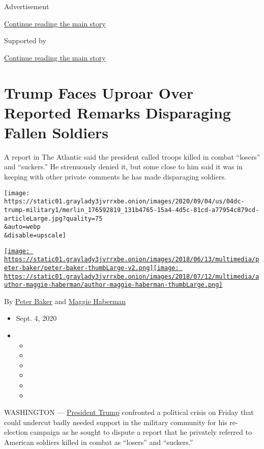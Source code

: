 Advertisement

\protect\hyperlink{after-top}{Continue reading the main story}

Supported by

\protect\hyperlink{after-sponsor}{Continue reading the main story}

\hypertarget{trump-faces-uproar-over-reported-remarks-disparaging-fallen-soldiers}{%
\section{Trump Faces Uproar Over Reported Remarks Disparaging Fallen
Soldiers}\label{trump-faces-uproar-over-reported-remarks-disparaging-fallen-soldiers}}

A report in The Atlantic said the president called troops killed in
combat ``losers'' and ``suckers.'' He strenuously denied it, but some
close to him said it was in keeping with other private comments he has
made disparaging soldiers.

\texttt{[image: https://static01.graylady3jvrrxbe.onion/images/2020/09/04/us/04dc-trump-military1/merlin\_176592819\_131b4765-15a4-4d5c-81cd-a77954c879cd-articleLarge.jpg?quality=75\\\&auto=webp\\\&disable=upscale]}

\href{https://www.nytimes3xbfgragh.onion/by/peter-baker}{\texttt{[image: https://static01.graylady3jvrrxbe.onion/images/2018/06/13/multimedia/peter-baker/peter-baker-thumbLarge-v2.png]}}\href{https://www.nytimes3xbfgragh.onion/by/maggie-haberman}{\texttt{[image: https://static01.graylady3jvrrxbe.onion/images/2018/07/12/multimedia/author-maggie-haberman/author-maggie-haberman-thumbLarge.png]}}

By \href{https://www.nytimes3xbfgragh.onion/by/peter-baker}{Peter Baker}
and \href{https://www.nytimes3xbfgragh.onion/by/maggie-haberman}{Maggie
Haberman}

\begin{itemize}
\item
  Sept. 4, 2020
\item
  \begin{itemize}
  \item
  \item
  \item
  \item
  \item
  \item
  \end{itemize}
\end{itemize}

WASHINGTON ---
\href{https://www.nytimes3xbfgragh.onion/interactive/2020/us/elections/donald-trump.html}{President
Trump} confronted a political crisis on Friday that could undercut badly
needed support in the military community for his re-election campaign as
he sought to dispute a report that he privately referred to American
soldiers killed in combat as ``losers'' and ``suckers.''

